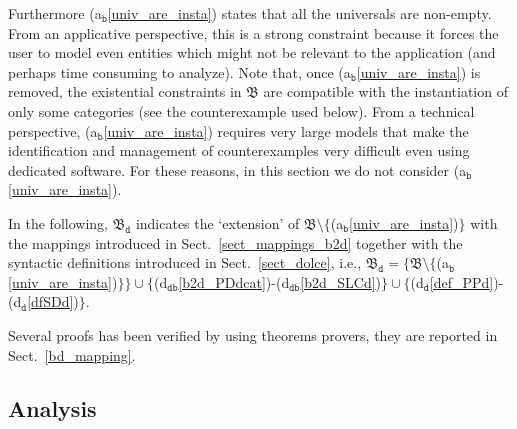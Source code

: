 \documentclass[ao]{iosart2x}
\newcommand{\bfoAxLabel}{\textrm{a$_\texttt{b}$}}
\newcommand{\dolceDefLabel}{\textrm{d$_\texttt{d}$}}
\newcommand{\dbDefLabel}{\textrm{d$_\texttt{db}$}}
\newcommand{\refdolcedf}[1]{({\dolceDefLabel}\ref{#1})}
\newcommand{\refbfoax}[1]{({\bfoAxLabel}\ref{#1})}
\newcommand{\refdbdf}[1]{({\dbDefLabel}\ref{#1})}
\newcommand{\dolce}{{\textsc{dolce}}}
\newcommand{\bfo}{{\textsc{bfo}}}
\newcommand {\thbfo} {\ensuremath{\mathfrak{B}}}
\newcommand {\dbmap} {\ensuremath{\mathfrak{M}_\texttt{db}}}
\newcommand {\bdmap} {\ensuremath{\mathfrak{M}_\texttt{bd}}}
\newcommand {\thbfobdmap} {\ensuremath{\mathfrak{B}_\texttt{d}}}
\begin{document}
Furthermore \refbfoax{univ_are_insta} states that all the universals are non-empty. From an applicative perspective, this is a strong constraint because it forces the user to model even entities which might not be relevant to the application (and perhaps time consuming to analyze). Note that, once \refbfoax{univ_are_insta} is removed, the existential constraints in $\thbfo$ are compatible with the instantiation of only some categories (see the counterexample used below). From a technical perspective, \refbfoax{univ_are_insta} requires very large models that make the identification and management of counterexamples very difficult even using dedicated software. For these reasons, in this section we do not consider \refbfoax{univ_are_insta}.   

In the following, $\thbfobdmap$ indicates the `extension' of $\thbfo \setminus \{$\refbfoax{univ_are_insta}$\}$ with the mappings introduced in Sect.~\ref{sect_mappings_b2d} together with the syntactic definitions introduced in Sect.~\ref{sect_dolce}, i.e., $\thbfobdmap = \{\thbfo \setminus \{$\refbfoax{univ_are_insta}$\}\} \cup \{$\refdbdf{b2d_PDdcat}-\refdbdf{b2d_SLCd}$\} \cup \{$\refdolcedf{def_PPd}-\refdolcedf{dfSDd}$\}$.
%
%


 Several proofs has been verified by using theorems provers, they are reported in Sect.~\ref{bd_mapping}.
 
\subsection{Analysis}\label{sect_analysis_b2d}
\end{document}
